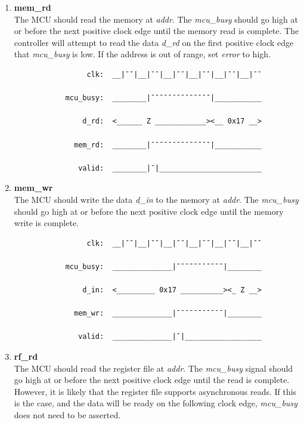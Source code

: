 \documentclass[10pt,a4paper]{article}
\begin{document}
\begin{enumerate}
    \newpage
    \item\textbf{mem\_rd}\\
    The MCU should read the memory at \emph{addr}. The \emph{mcu\_busy} should go
     high at or before the next positive clock edge until the memory read is complete. The
    controller will attempt to read the data \emph{d\_rd} on the first positive clock edge that
    \emph{mcu\_busy} is low. If the address is out of range, set \emph{error} to high.

        \begin{verbatim}
                 clk:  __|¯¯|__|¯¯|__|¯¯|__|¯¯|__|¯¯|__|¯¯

            mcu_busy:  ________|¯¯¯¯¯¯¯¯¯¯¯¯¯¯|___________

                d_rd:  <______ Z ____________><__ 0x17 __>

              mem_rd:  ________|¯¯¯¯¯¯¯¯¯¯¯¯¯¯|___________

               valid:  ________|¯|________________________
        \end{verbatim}

    \item\textbf{mem\_wr}\\
    The MCU should write the data \emph{d\_in} to the memory at \emph{addr}. The \emph{mcu\_busy}
    should go high at or before the next positive clock edge until the memory write is complete.

        \begin{verbatim}
                 clk:  __|¯¯|__|¯¯|__|¯¯|__|¯¯|__|¯¯|__|¯¯

            mcu_busy:  ______________|¯¯¯¯¯¯¯¯¯¯¯|________

                d_in:  <_________ 0x17 __________><_ Z __>

              mem_wr:  ______________|¯¯¯¯¯¯¯¯¯¯¯|________

               valid:  ______________|¯|__________________
        \end{verbatim}

    \item\textbf{rf\_rd}\\
    The MCU should read the register file at \emph{addr}. The \emph{mcu\_busy} signal should go
    high at or before the next positive clock edge until the read is complete. However, it is
    likely that the register file supports asynchronous reads. If this is the case, and the data
    will be ready on the following clock edge, \emph{mcu\_busy} does not need to be asserted.


\end{enumerate}
\end{document}
